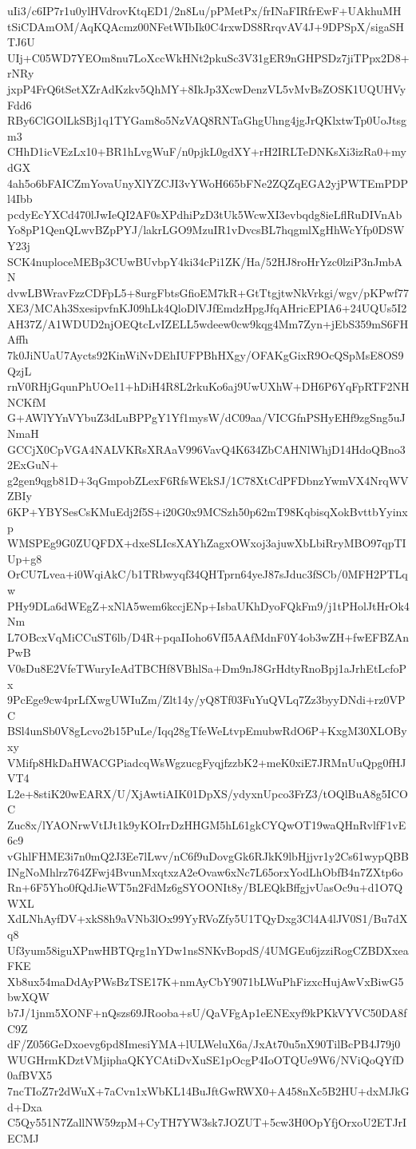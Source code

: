 uIi3/c6IP7r1u0ylHVdrovKtqED1/2n8Lu/pPMetPx/frINaFIRfrEwF+UAkhuMH
tSiCDAmOM/AqKQAcmz00NFetWIbIk0C4rxwDS8RrqvAV4J+9DPSpX/sigaSHTJ6U
UIj+C05WD7YEOm8nu7LoXccWkHNt2pkuSc3V31gER9nGHPSDz7jiTPpx2D8+rNRy
jxpP4FrQ6tSetXZrAdKzkv5QhMY+8IkJp3XcwDenzVL5vMvBsZOSK1UQUHVyFdd6
RBy6ClGOlLkSBj1q1TYGam8o5NzVAQ8RNTaGhgUhng4jgJrQKlxtwTp0UoJtsgm3
CHhD1icVEzLx10+BR1hLvgWuF/n0pjkL0gdXY+rH2IRLTeDNKsXi3izRa0+mydGX
4ah5o6bFAICZmYovaUnyXlYZCJI3vYWoH665bFNe2ZQZqEGA2yjPWTEmPDPl4Ibb
pcdyEcYXCd470lJwIeQI2AF0sXPdhiPzD3tUk5WcwXI3evbqdg8ieLflRuDIVnAb
Yo8pP1QenQLwvBZpPYJ/lakrLGO9MzuIR1vDvcsBL7hqgmlXgHhWcYfp0DSWY23j
SCK4nuploceMEBp3CUwBUvbpY4ki34cPi1ZK/Ha/52HJ8roHrYzc0lziP3nJmbAN
dvwLBWravFzzCDFpL5+8urgFbtsGfioEM7kR+GtTtgjtwNkVrkgi/wgv/pKPwf77
XE3/MCAh3SxesipvfnKJ09hLk4QloDlVJfEmdzHpgJfqAHricEPIA6+24UQUs5I2
AH37Z/A1WDUD2njOEQtcLvIZELL5wdeew0cw9kqg4Mm7Zyn+jEbS359mS6FHAffh
7k0JiNUaU7Aycts92KinWiNvDEhIUFPBhHXgy/OFAKgGixR9OcQSpMsE8OS9QzjL
rnV0RHjGqunPhUOe11+hDiH4R8L2rkuKo6aj9UwUXhW+DH6P6YqFpRTF2NHNCKfM
G+AWlYYnVYbuZ3dLuBPPgY1Yf1mysW/dC09aa/VICGfnPSHyEHf9zgSng5uJNmaH
GCCjX0CpVGA4NALVKRsXRAaV996VavQ4K634ZbCAHNlWhjD14HdoQBno32ExGuN+
g2gen9qgb81D+3qGmpobZLexF6RfsWEkSJ/1C78XtCdPFDbnzYwmVX4NrqWVZBIy
6KP+YBYSesCsKMuEdj2f5S+i20G0x9MCSzh50p62mT98KqbisqXokBvttbYyinxp
WMSPEg9G0ZUQFDX+dxeSLIcsXAYhZagxOWxoj3ajuwXbLbiRryMBO97qpTIUp+g8
OrCU7Lvea+i0WqiAkC/b1TRbwyqf34QHTprn64yeJ87sJduc3fSCb/0MFH2PTLqw
PHy9DLa6dWEgZ+xNlA5wem6kccjENp+IsbaUKhDyoFQkFm9/j1tPHolJtHrOk4Nm
L7OBcxVqMiCCuST6lb/D4R+pqaIIoho6VfI5AAfMdnF0Y4ob3wZH+fwEFBZAnPwB
V0sDu8E2VfeTWuryIeAdTBCHf8VBhlSa+Dm9nJ8GrHdtyRnoBpj1aJrhEtLcfoPx
9PcEge9cw4prLfXwgUWIuZm/Zlt14y/yQ8Tf03FuYuQVLq7Zz3byyDNdi+rz0VPC
BSl4unSb0V8gLcvo2b15PuLe/Iqq28gTfeWeLtvpEmubwRdO6P+KxgM30XLOByxy
VMifp8HkDaHWACGPiadcqWsWgzucgFyqjfzzbK2+meK0xiE7JRMnUuQpg0fHJVT4
L2e+8stiK20wEARX/U/XjAwtiAIK01DpXS/ydyxnUpco3FrZ3/tOQlBuA8g5ICOC
Zuc8x/lYAONrwVtIJt1k9yKOIrrDzHHGM5hL61gkCYQwOT19waQHnRvlfF1vE6c9
vGhlFHME3i7n0mQ2J3Ee7lLwv/nC6f9uDovgGk6RJkK9lbHjjvr1y2Cs61wypQBB
INgNoMhlrz764ZFwj4BvunMxqtxzA2eOvaw6xNc7L65orxYodLhObfB4n7ZXtp6o
Rn+6F5Yho0fQdJieWT5n2FdMz6gSYOONIt8y/BLEQkBffgjvUasOc9u+d1O7QWXL
XdLNhAyfDV+xkS8h9aVNb3lOx99YyRVoZfy5U1TQyDxg3Cl4A4lJV0S1/Bu7dXq8
Uf3yum58iguXPnwHBTQrg1nYDw1nsSNKvBopdS/4UMGEu6jzziRogCZBDXxeaFKE
Xb8ux54maDdAyPWsBzTSE17K+nmAyCbY9071bLWuPhFizxcHujAwVxBiwG5bwXQW
b7J/1jnm5XONF+nQszs69JRooba+sU/QaVFgAp1eENExyf9kPKkVYVC50DA8fC9Z
dF/Z056GeDxoevg6pd8ImesiYMA+lULWeluX6a/JxAt70u5nX90TilBcPB4J79j0
WUGHrmKDztVMjiphaQKYCAtiDvXuSE1pOcgP4IoOTQUe9W6/NViQoQYfD0afBVX5
7ncTIoZ7r2dWuX+7aCvn1xWbKL14BuJftGwRWX0+A458nXc5B2HU+dxMJkGd+Dxa
C5Qy551N7ZallNW59zpM+CyTH7YW3sk7JOZUT+5cw3H0OpYfjOrxoU2ETJrIECMJ

